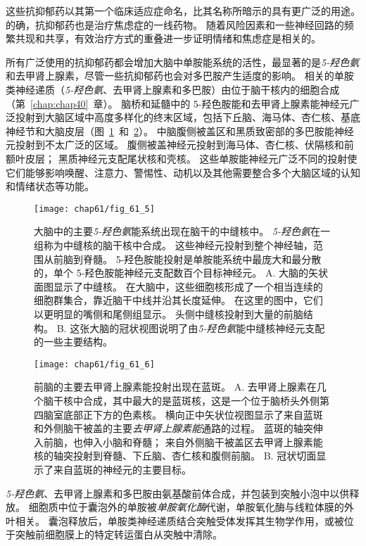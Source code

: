 这些抗抑郁药以其第一个临床适应症命名，比其名称所暗示的具有更广泛的用途。
的确，抗抑郁药也是治疗焦虑症的一线药物。
随着风险因素和一些神经回路的频繁共现和共享，有效治疗方式的重叠进一步证明情绪和焦虑症是相关的。


所有广泛使用的抗抑郁药都会增加大脑中单胺能系统的活性，最显著的是\textit{5-羟色氨}和去甲肾上腺素，尽管一些抗抑郁药也会对多巴胺产生适度的影响。
相关的单胺类神经递质（\textit{5-羟色氨}、去甲肾上腺素和多巴胺）由位于脑干核内的细胞合成（第~\ref{chap:chap40}~章）。
脑桥和延髓中的 5-羟色胺能和去甲肾上腺素能神经元广泛投射到大脑区域中高度多样化的终末区域，包括下丘脑、海马体、杏仁核、基底神经节和大脑皮层（图~\ref{fig:61_5}~和~\ref{fig:61_6}）。
中脑腹侧被盖区和黑质致密部的多巴胺能神经元投射到不太广泛的区域。
腹侧被盖神经元投射到海马体、杏仁核、伏隔核和前额叶皮层；
黑质神经元支配尾状核和壳核。
这些单胺能神经元广泛不同的投射使它们能够影响唤醒、注意力、警惕性、动机以及其他需要整合多个大脑区域的认知和情绪状态等功能。


\begin{figure}[htbp]
	\centering
	\texttt{[image: chap61/fig\_61\_5]}
	\caption{大脑中的主要\textit{5-羟色氨}能系统出现在脑干的中缝核中。
		\textit{5-羟色氨}在一组称为中缝核的脑干核中合成。
		这些神经元投射到整个神经轴，范围从前脑到脊髓。
		5-羟色胺能投射是单胺能系统中最庞大和最分散的，单个 5-羟色胺能神经元支配数百个目标神经元\cite{heimer2012human}。
		A. 大脑的矢状面图显示了中缝核。
		在大脑中，这些细胞核形成了一个相当连续的细胞群集合，靠近脑干中线并沿其长度延伸。
		在这里的图中，它们以更明显的嘴侧和尾侧组显示。
		头侧中缝核投射到大量的前脑结构。
		B. 这张大脑的冠状视图说明了由\textit{5-羟色氨}能中缝核神经元支配的一些主要结构。}
	\label{fig:61_5}
\end{figure}


\begin{figure}[htbp]
	\centering
	\texttt{[image: chap61/fig\_61\_6]}
	\caption{前脑的主要去甲肾上腺素能投射出现在蓝斑\cite{heimer2012human}。
		A. 去甲肾上腺素在几个脑干核中合成，其中最大的是蓝斑核，这是一个位于脑桥头外侧第四脑室底部正下方的色素核。
		横向正中矢状位视图显示了来自蓝斑和外侧脑干被盖的主要\textit{去甲肾上腺素能}通路的过程。
		蓝斑的轴突伸入前脑，也伸入小脑和脊髓；
		来自外侧脑干被盖区去甲肾上腺素能核的轴突投射到脊髓、下丘脑、杏仁核和腹侧前脑。
		B. 冠状切面显示了来自蓝斑的神经元的主要目标。}
	\label{fig:61_6}
\end{figure}


\textit{5-羟色氨}、去甲肾上腺素和多巴胺由氨基酸前体合成，并包装到突触小泡中以供释放。
细胞质中位于囊泡外的单胺被\textit{单胺氧化酶}代谢，单胺氧化酶与线粒体膜的外叶相关。
囊泡释放后，单胺类神经递质结合突触受体发挥其生物学作用，或被位于突触前细胞膜上的特定转运蛋白从突触中清除。


